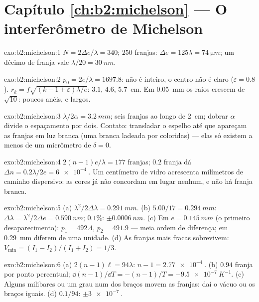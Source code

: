 \section*{Capítulo \ref{ch:b2:michelson} --- O interferômetro de Michelson}

\begin{solution}{exo:b2:michelson:1}
$N = 2\Delta e/\lambda = 340$; $250$ franjas: $\Delta e = 125\lambda = \qty{74}{\micro m}$; um décimo de
franja vale $\lambda/20 = \qty{30}{nm}$.
\end{solution}

\begin{solution}{exo:b2:michelson:2}
$p_0 = 2e/\lambda = 1697.8$: não é inteiro, o centro não é claro ($\varepsilon =
0.8$). $r_k = f\sqrt{(k - 1 + \varepsilon)\lambda/e}$: $3.1$, $4.6$, \qty{5.7}{cm}. Em \qty{0.05}{mm} os
raios crescem de $\sqrt{10}$: poucos anéis, e largos.
\end{solution}

\begin{solution}{exo:b2:michelson:3}
$\lambda/2\alpha = \qty{3.2}{mm}$; seis franjas ao longo de \qty{2}{cm}; dobrar $\alpha$ divide o
espaçamento por dois. Contato: transladar o espelho até que apareçam as
franjas em luz branca (uma branca ladeada por coloridas) --- elas só existem
a menos de um micrômetro de $\delta = 0$.
\end{solution}

\begin{solution}{exo:b2:michelson:4}
$2(n - 1)e/\lambda = 177$ franjas; $0.2$ franja dá $\Delta n = 0.2\lambda/2e = \qty{6e-4}{}$.
Um centímetro de vidro acrescenta milímetros de caminho dispersivo: as cores
já não concordam em lugar nenhum, e não há franja branca.
\end{solution}

\begin{solution}{exo:b2:michelson:5}
(a) $\lambda^2/2\Delta\lambda = \qty{0.291}{mm}$. (b) $5.00/17 = \qty{0.294}{mm}$: $\Delta\lambda = \lambda^2/2\Delta e =
\qty{0.590}{nm}$; $0.1\%$: $\pm\qty{0.0006}{nm}$. (c) Em $e = \qty{0.145}{mm}$ (o primeiro
desaparecimento): $p_1 = 492.4$, $p_2 = 491.9$ --- meia ordem de diferença; em
\qty{0.29}{mm} diferem de uma unidade. (d) As franjas mais fracas sobrevivem: $V_{\min} =
(I_1 - I_2)/(I_1 + I_2) = 1/3$.
\end{solution}

\begin{solution}{exo:b2:michelson:6}
(a) $2(n - 1)\ell = 94\lambda$: $n - 1 = \qty{2.77e-4}{}$. (b) $0.94$ franja por ponto percentual;
$\dd(n - 1)/\dd T = -(n - 1)/T = \qty{-9.5e-7}{K^{-1}}$. (c) Alguns milibares ou um
grau num dos braços movem as franjas: daí o vácuo ou os braços iguais. (d)
$0.1/94$: $\pm\qty{3e-7}{}$.
\end{solution}

